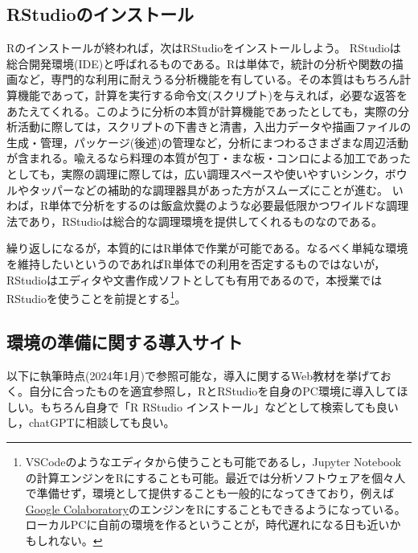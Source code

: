 \documentclass[
  a4paper,
]{ltjsbook}
\begin{document}
\hypertarget{rstudioux306eux30a4ux30f3ux30b9ux30c8ux30fcux30eb}{%
\subsection{RStudioのインストール}\label{rstudioux306eux30a4ux30f3ux30b9ux30c8ux30fcux30eb}}

Rのインストールが終われば，次はRStudioをインストールしよう。
RStudioは総合開発環境(IDE)と呼ばれるものである。Rは単体で，統計の分析や関数の描画など，専門的な利用に耐えうる分析機能を有している。その本質はもちろん計算機能であって，計算を実行する命令文(スクリプト)を与えれば，必要な返答をあたえてくれる。このように分析の本質が計算機能であったとしても，実際の分析活動に際しては，スクリプトの下書きと清書，入出力データや描画ファイルの生成・管理，パッケージ(後述)の管理など，分析にまつわるさまざまな周辺活動が含まれる。喩えるなら料理の本質が包丁・まな板・コンロによる加工であったとしても，実際の調理に際しては，広い調理スペースや使いやすいシンク，ボウルやタッパーなどの補助的な調理器具があった方がスムーズにことが進む。
いわば，R単体で分析をするのは飯盒炊爨のような必要最低限かつワイルドな調理法であり，RStudioは総合的な調理環境を提供してくれるものなのである。

繰り返しになるが，本質的にはR単体で作業が可能である。なるべく単純な環境を維持したいというのであればR単体での利用を否定するものではないが，RStudioはエディタや文書作成ソフトとしても有用であるので，本授業ではRStudioを使うことを前提とする\footnote{VSCodeのようなエディタから使うことも可能であるし，Jupyter
  Notebookの計算エンジンをRにすることも可能。最近では分析ソフトウェアを個々人で準備せず，環境として提供することも一般的になってきており，例えば\href{https://colab.research.google.com/}{Google
  Colaboratory}のエンジンをRにすることもできるようになっている。ローカルPCに自前の環境を作るということが，時代遅れになる日も近いかもしれない。}。

\hypertarget{ux74b0ux5883ux306eux6e96ux5099ux306bux95a2ux3059ux308bux5c0eux5165ux30b5ux30a4ux30c8}{%
\subsection{環境の準備に関する導入サイト}\label{ux74b0ux5883ux306eux6e96ux5099ux306bux95a2ux3059ux308bux5c0eux5165ux30b5ux30a4ux30c8}}

以下に執筆時点(2024年1月)で参照可能な，導入に関するWeb教材を挙げておく。自分に合ったものを適宜参照し，RとRStudioを自身のPC環境に導入してほしい。もちろん自身で「R
RStudio
インストール」などとして検索しても良いし，chatGPTに相談しても良い。
\end{document}
